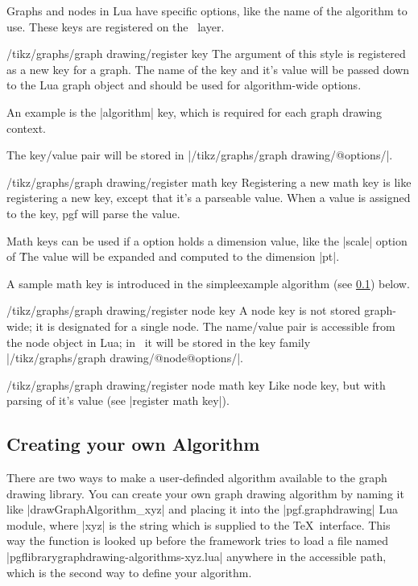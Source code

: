Graphs and nodes in Lua have specific options, like the name of the
algorithm to use. These keys are registered on the \tikzname\ layer.


\begin{stylekey}{/tikz/graphs/graph drawing/register key}
  The argument of this style is registered as a new key for a
  graph. The name of the key and it's value will be passed down to the
  Lua graph object and should be used for algorithm-wide options. 

  An example is the |algorithm| key, which is required for each graph
  drawing context. 

  The key/value pair will be stored in |/tikz/graphs/graph drawing/@options/|.
\end{stylekey}

\begin{stylekey}{/tikz/graphs/graph drawing/register math key}
  Registering a new math key is like registering a new key, except
  that it's a parseable value. When a value is assigned to the key,
  pgf will parse the value. 

  Math keys can be used if a option holds a dimension value, like the
  |scale| option of \tikzname\. The value will be expanded and
  computed to the dimension |pt|. 

  A sample math key is introduced in the simpleexample algorithm
  (see \ref{section-library-graphdrawing-ownAlgorithm}) below.
\end{stylekey}

\begin{stylekey}{/tikz/graphs/graph drawing/register node key}
  A node key is not stored graph-wide; it is designated for a single
  node. The name/value pair is accessible from the node object in Lua;
  in \tikzname\ it will be stored in the key family |/tikz/graphs/graph drawing/@node@options/|.
\end{stylekey}

\begin{stylekey}{/tikz/graphs/graph drawing/register node math key}
  Like node key, but with parsing of it's value (see |register math key|).
\end{stylekey}

\subsection{Creating your own Algorithm}
\label{section-library-graphdrawing-ownAlgorithm}
There are two ways to make a user-definded algorithm
available to the graph drawing library.
You can create your own graph drawing algorithm by naming it like
|drawGraphAlgorithm_xyz| and placing it into the |pgf.graphdrawing|
Lua module, where |xyz| is the string which is supplied to the
\TeX\ interface.  This way the function is looked up before the
framework tries to load a file named
|pgflibrarygraphdrawing-algorithms-xyz.lua| anywhere in the accessible
path, which is the second way to define your algorithm.

